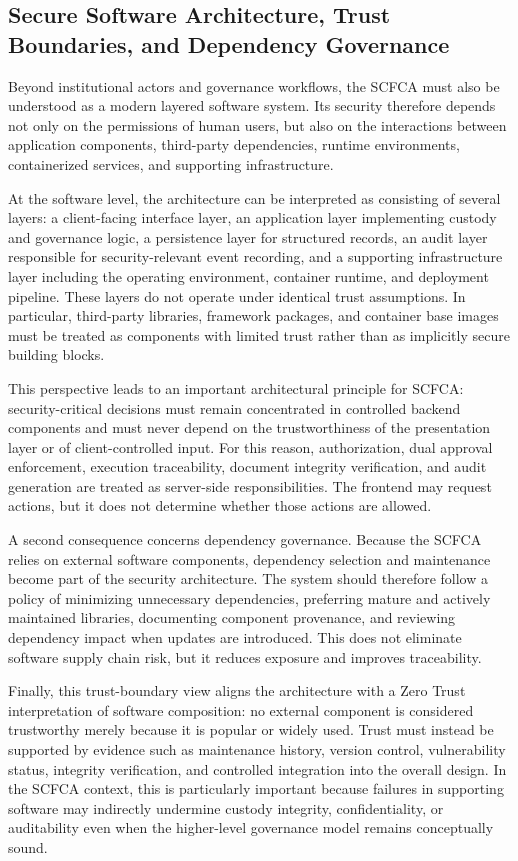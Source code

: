 \documentclass[12pt,a4paper]{report}
\begin{document}
\subsection{Secure Software Architecture, Trust Boundaries, and Dependency Governance}

Beyond institutional actors and governance workflows, the SCFCA must also be understood as a modern layered software system. Its security therefore depends not only on the permissions of human users, but also on the interactions between application components, third-party dependencies, runtime environments, containerized services, and supporting infrastructure.

At the software level, the architecture can be interpreted as consisting of several layers: a client-facing interface layer, an application layer implementing custody and governance logic, a persistence layer for structured records, an audit layer responsible for security-relevant event recording, and a supporting infrastructure layer including the operating environment, container runtime, and deployment pipeline. These layers do not operate under identical trust assumptions. In particular, third-party libraries, framework packages, and container base images must be treated as components with limited trust rather than as implicitly secure building blocks.

This perspective leads to an important architectural principle for SCFCA: security-critical decisions must remain concentrated in controlled backend components and must never depend on the trustworthiness of the presentation layer or of client-controlled input. For this reason, authorization, dual approval enforcement, execution traceability, document integrity verification, and audit generation are treated as server-side responsibilities. The frontend may request actions, but it does not determine whether those actions are allowed.

A second consequence concerns dependency governance. Because the SCFCA relies on external software components, dependency selection and maintenance become part of the security architecture. The system should therefore follow a policy of minimizing unnecessary dependencies, preferring mature and actively maintained libraries, documenting component provenance, and reviewing dependency impact when updates are introduced. This does not eliminate software supply chain risk, but it reduces exposure and improves traceability.

Finally, this trust-boundary view aligns the architecture with a Zero Trust interpretation of software composition: no external component is considered trustworthy merely because it is popular or widely used. Trust must instead be supported by evidence such as maintenance history, version control, vulnerability status, integrity verification, and controlled integration into the overall design. In the SCFCA context, this is particularly important because failures in supporting software may indirectly undermine custody integrity, confidentiality, or auditability even when the higher-level governance model remains conceptually sound.
\end{document}
